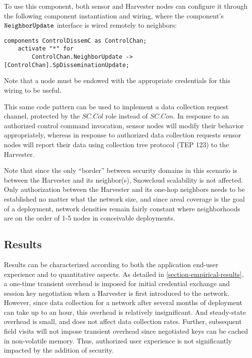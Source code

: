 To use this component, both sensor and Harvester nodes can configure 
it through the following component instantiation and wiring, where 
the component's $\verb+NeighborUpdate+$ interface is wired remotely
to neighbors: 
\begin{Verbatim}[fontsize=\small]
    components ControlDissemC as ControlChan;
    activate "*" for 
        ControlChan.NeighborUpdate -> [ControlChan].SpDisseminationUpdate;
\end{Verbatim}
Note that a node must be endowed with the appropriate credentials for
this wiring to be useful. 

This same code pattern can be used to implement a data collection
request channel, protected by the $\mathit{SC.Col}$ role instead of
$\mathit{SC.Con}$. In response to an authorized control command
invocation, sensor nodes will modify their behavior appropriately,
whereas in response to authorized data collection requests sensor
nodes will report their data using collection tree protocol (TEP 123)
to the Harvester.

Note that since the only ``border'' between security domains in this
scenario is between the Harvester and its neighbor(s), Snowcloud
scalability is not affected. Only authorization between the Harvester
and its one-hop neighbors needs to be established no matter what the
network size, and since areal coverage is the goal of a deployment,
network densities remain fairly constant where neighborhoods are on
the order of 1-5 nodes in conceivable deployments.

\subsection{Results}

Results can be characterized according to both the application
end-user experience and to quantitative aspects. As detailed in
\autoref{section-empirical-results}, a one-time transient overhead is
imposed for initial credential exchange and session key negotiation
when a Harvester is first introduced to the network. However, since
data collection for a network after several months of deployment can
take up to an hour, this overhead is relatively insignificant. And
steady-state overhead is small, and does not affect data collection
rates. Further, subsequent field visits will not impose transient
overhead since negotiated keys can be cached in non-volatile
memory. Thus, authorized user experience is not significantly impacted
by the addition of security.

